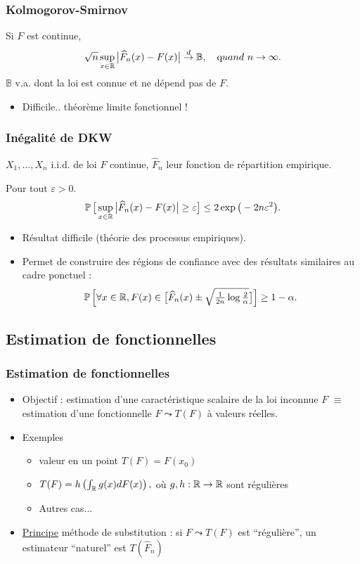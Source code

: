 \begin{frame}
\frametitle{Kolmogorov-Smirnov}
\begin{theo}
Si $F$ est continue, $$\sqrt{n}\sup_{x \in \operatorname{{\mathbb R}}}\big|\widehat F_n(x)-F(x)\big|
\stackrel{d}{\rightarrow} \mathbb{B}, \quad {\text quand} \ n\to
\infty.$$
$\mathbb{B}$ v.a. dont la loi est connue et \alert{
ne dépend pas} de $F$.
\end{theo}
\begin{itemize}
\item \alert{Difficile}.. théorème limite \alert{fonctionnel} !
\end{itemize}
\end{frame}

\begin{frame}
\frametitle{Inégalité de DKW}
$X_1,\ldots, X_n$ i.i.d. de loi $F$ \alert{continue}, $\widehat F_n$ leur fonction de répartition empirique.
\begin{prop} Pour tout $\varepsilon >0$.
$$\operatorname{{\mathbb P}}\big[\sup_{x \in \operatorname{{\mathbb R}}}\big|\widehat F_n(x)-F(x)\big|\geq \varepsilon\big] \leq 2 \exp\big(-2n\varepsilon^2\big).$$
\end{prop}
\begin{itemize}
\item Résultat difficile (théorie des processus empiriques).
\item Permet de construire des \alert{régions} de confiance avec des résultats similaires au cadre ponctuel :
$$\operatorname{{\mathbb P}}\Big[\forall x \in \operatorname{{\mathbb R}}, F(x)\in \big[\widehat F_n(x)\pm\sqrt{\tfrac{1}{2n}\log \tfrac{2}{\alpha}}\big]\Big]\geq 1-\alpha.$$
\end{itemize}
\end{frame}
\subsection{Estimation de fonctionnelles}
\begin{frame}
\frametitle{Estimation de fonctionnelles}
\begin{itemize}
\item \alert{Objectif :} estimation d'une caractéristique
scalaire de la loi inconnue $F$ $\equiv$ estimation d'une
fonctionnelle $F \leadsto T(F)$ à valeurs réelles.
\item \alert{Exemples}
\begin{itemize}
\item valeur en un point  $T(F) = F(x_0)$
\item  $T(F) = h\left(\int_{\operatorname{{\mathbb R}}}g(x)dF(x)\right),$
où $g,h: \operatorname{{\mathbb R}} \rightarrow \operatorname{{\mathbb R}}$ sont \alert{régulières}
\item \alert{Autres cas...} 
\end{itemize}
\item \underline{Principe} \alert{méthode de substitution} : si $F \leadsto T(F)$ est
``régulière'', un estimateur ``naturel'' est $T(\widehat{F}_n)$
\end{itemize}
\end{frame}

